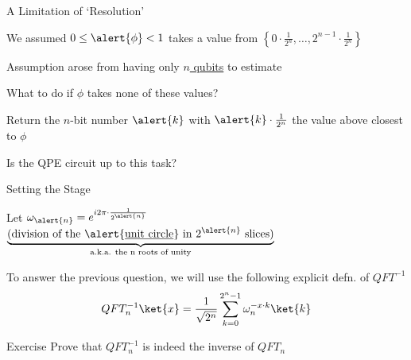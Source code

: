 \documentclass{beamer}
\begin{document}
\begin{frame}{A Limitation of `Resolution'}

        We assumed $0 \leq \alert{\phi} < 1$ takes a value from $\left \{
        0 \cdot \frac{1}{2^n}, \dots, 2^{n-1} \cdot
        \frac{1}{2^n} \right \}$

        Assumption arose from having only \alert{\underline{$n$ qubits}}
        to estimate 

        What to do if $\phi$ takes none of these values?

        \pause
        Return the $n$-bit number $\alert{k}$ with $\alert{k} \cdot
        \frac{1}{2^n}$ the value above \alert{closest} to $\phi$

        \pause
        Is the QPE circuit up to this task?
\end{frame}

\begin{frame}{Setting the Stage}

        Let $\omega_{\alert{n}} = e^{i 2 \pi \cdot \frac{1}{2^{\alert{n}}}}$
        $\underbrace{\text{(division of the \alert{\underline{unit circle}} in
        $2^{\alert{n}}$ slices)}}_{\text{a.k.a. the n roots of unity}}$

        \vspace{0.3cm}
        To answer the previous question, we will use the following explicit
        defn. of $QFT^{-1}$
        \[
                QFT^{-1}_n \ket{x} = 
                \frac{1}{\sqrt{2^n}} \sum_{k = 0}^{2^n -1}
                \omega_n^{-x \cdot k} \ket{k}
        \]

        \pause
        \begin{block}{Exercise}
                Prove that $QFT^{-1}_n$ is indeed the inverse
                of $QFT_n$
        \end{block}
\end{frame} 
\end{document}

